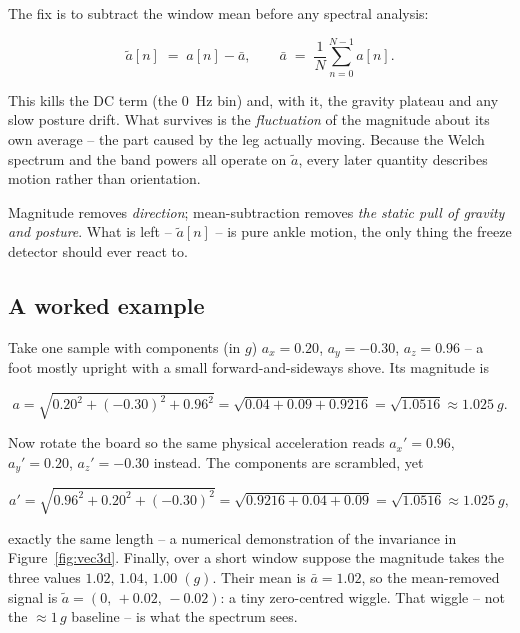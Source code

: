 The fix is to subtract the window mean before any spectral analysis:

\begin{equation}
\tilde a[n] \;=\; a[n]-\bar a,
\qquad
\bar a \;=\; \frac{1}{N}\sum_{n=0}^{N-1} a[n].
\label{eq:demean}
\end{equation}

This kills the DC term (the \SI{0}{Hz} bin) and, with it, the gravity plateau and any
slow posture drift. What survives is the \emph{fluctuation} of the magnitude about its
own average -- the part caused by the leg actually moving. Because the Welch spectrum
and the band powers all operate on $\tilde a$, every later quantity describes motion
rather than orientation.

\begin{takeaway}
Magnitude removes \emph{direction}; mean-subtraction removes \emph{the static pull of
gravity and posture}. What is left -- $\tilde a[n]$ -- is pure ankle motion, the only
thing the freeze detector should ever react to.
\end{takeaway}

\subsection{A worked example}

Take one sample with components (in $g$) $a_x=0.20$, $a_y=-0.30$, $a_z=0.96$ -- a foot
mostly upright with a small forward-and-sideways shove. Its magnitude is

\[
a=\sqrt{0.20^{2}+(-0.30)^{2}+0.96^{2}}
 =\sqrt{0.04+0.09+0.9216}
 =\sqrt{1.0516}\approx \SI{1.025}{\textit{g}}.
\]

Now rotate the board so the same physical acceleration reads
$a_x'=0.96$, $a_y'=0.20$, $a_z'=-0.30$ instead. The components are scrambled, yet

\[
a'=\sqrt{0.96^{2}+0.20^{2}+(-0.30)^{2}}=\sqrt{0.9216+0.04+0.09}=\sqrt{1.0516}\approx \SI{1.025}{\textit{g}},
\]

exactly the same length -- a numerical demonstration of the invariance in
Figure~\ref{fig:vec3d}. Finally, over a short window suppose the magnitude takes the
three values $1.02,\,1.04,\,1.00\;(g)$. Their mean is $\bar a=1.02$, so the
mean-removed signal is $\tilde a=(0,\,+0.02,\,-0.02)$: a tiny zero-centred wiggle.
That wiggle -- not the $\approx\!1\,g$ baseline -- is what the spectrum sees.

